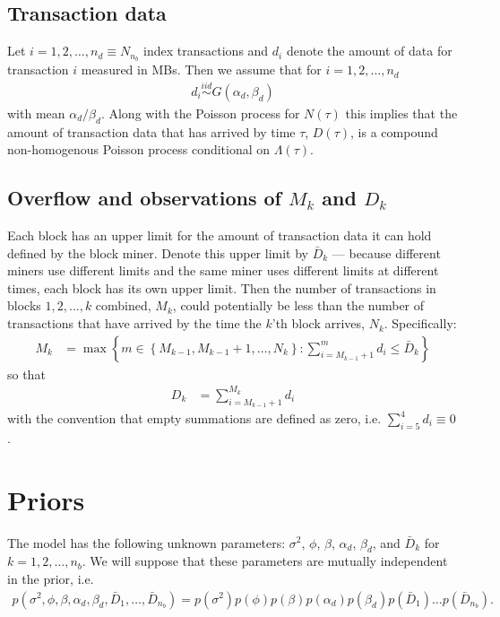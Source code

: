 \documentclass{article}
\begin{document}
\subsection{Transaction data}
Let $i=1,2,\dots,n_d \equiv N_{n_b}$ index transactions and $d_i$ denote the amount of data for transaction $i$ measured in MBs. Then we assume that for $i=1,2,\dots,n_d$
\begin{align*}
d_i \stackrel{iid}{\sim} G(\alpha_d,\beta_d)
\end{align*}
with mean $\alpha_d/\beta_d$. Along with the Poisson process for $N(\tau)$ this implies that the amount of transaction data that has arrived by time $\tau$, $D(\tau)$, is a compound non-homogenous Poisson process conditional on $\Lambda(\tau)$.

\subsection{Overflow and observations of $M_k$ and $D_k$}
Each block has an upper limit for the amount of transaction data it can hold defined by the block miner. Denote this upper limit by $\bar{D}_k$ --- because different miners use different limits and the same miner uses different limits at different times, each block has its own upper limit. Then the number of transactions in blocks $1,2,\dots,k$ combined, $M_k$, could potentially be less than the number of transactions that have arrived by the time the $k$'th block arrives, $N_k$. Specifically:
\begin{align*}
M_k &= \max\left\{m\in\left\{M_{k-1}, M_{k-1} + 1, \dots, N_k\right\}: \sum_{i = M_{k-1} + 1}^m d_i \le \bar{D}_k\right\}
\end{align*}
so that
\begin{align*}
D_k &= \sum_{i = M_{k-1} + 1}^{M_k} d_i
\end{align*}
with the convention that empty summations are defined as zero, i.e. $\sum_{i=5}^4d_i \equiv 0$. 

\section{Priors}
The model has the following unknown parameters: $\sigma^2$, $\phi$, $\beta$, $\alpha_d$, $\beta_d$, and $\bar{D}_k$ for $k=1,2,\dots,n_b$. We will suppose that these parameters are mutually independent in the prior, i.e.
\begin{align*}
p(\sigma^2,\phi,\beta,\alpha_d,\beta_d,\bar{D}_1,\dots,\bar{D}_{n_{b}}) = p(\sigma^2)p(\phi)p(\beta)p(\alpha_d)p(\beta_d)p(\bar{D}_1)\hdots p(\bar{D}_{n_{b}}).
\end{align*}
\end{document}
